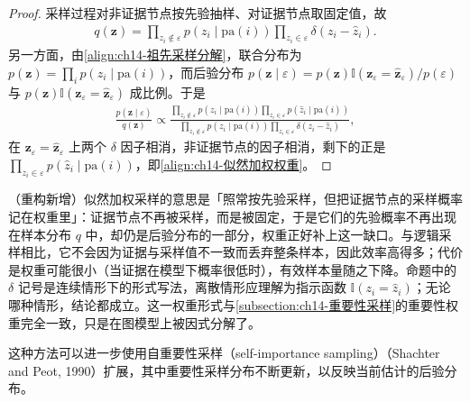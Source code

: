 \documentclass[../../main.tex]{subfiles}
\begin{document}
\begin{proof}
采样过程对非证据节点按先验抽样、对证据节点取固定值，故
\begin{align*}
q(\bm{z})=\prod_{z_{i}\notin\varepsilon}p\!\left(z_{i}\mid\mathrm{pa}(i)\right)\prod_{z_{i}\in\varepsilon}\delta\!\left(z_{i}-\hat{z}_{i}\right).
\end{align*}
另一方面，由\eqref{align:ch14-祖先采样分解}，联合分布为 $p(\bm{z})=\prod_{i}p\!\left(z_{i}\mid\mathrm{pa}(i)\right)$，而后验分布 $p\!\left(\bm{z}\mid\varepsilon\right)=p(\bm{z})\mathbb{I}\left(\bm{z}_{\varepsilon}=\hat{\bm{z}}_{\varepsilon}\right)/p(\varepsilon)$ 与 $p(\bm{z})\mathbb{I}\left(\bm{z}_{\varepsilon}=\hat{\bm{z}}_{\varepsilon}\right)$ 成比例。于是
\begin{align*}
\frac{p\!\left(\bm{z}\mid\varepsilon\right)}{q(\bm{z})}\propto\frac{\prod_{z_{i}\notin\varepsilon}p\!\left(z_{i}\mid\mathrm{pa}(i)\right)\prod_{z_{i}\in\varepsilon}p\!\left(\hat{z}_{i}\mid\mathrm{pa}(i)\right)}{\prod_{z_{i}\notin\varepsilon}p\!\left(z_{i}\mid\mathrm{pa}(i)\right)\prod_{z_{i}\in\varepsilon}\delta\!\left(z_{i}-\hat{z}_{i}\right)},
\end{align*}
在 $\bm{z}_{\varepsilon}=\hat{\bm{z}}_{\varepsilon}$ 上两个 $\delta$ 因子相消，非证据节点的因子相消，剩下的正是 $\prod_{z_{i}\in\varepsilon}p\!\left(\hat{z}_{i}\mid\mathrm{pa}(i)\right)$，即\eqref{align:ch14-似然加权权重}。
\end{proof}

\begin{remark}（重构新增）似然加权采样的意思是「照常按先验采样，但把证据节点的采样概率记在权重里」：证据节点不再被采样，而是被固定，于是它们的先验概率不再出现在样本分布 $q$ 中，却仍是后验分布的一部分，权重正好补上这一缺口。与逻辑采样相比，它不会因为证据与采样值不一致而丢弃整条样本，因此效率高得多；代价是权重可能很小（当证据在模型下概率很低时），有效样本量随之下降。命题中的 $\delta$ 记号是连续情形下的形式写法，离散情形应理解为指示函数 $\mathbb{I}\left(z_{i}=\hat{z}_{i}\right)$；无论哪种情形，结论都成立。这一权重形式与\cref{subsection:ch14-重要性采样}的重要性权重完全一致，只是在图模型上被因式分解了。
\end{remark}

这种方法可以进一步使用自重要性采样（self-importance sampling）（Shachter and Peot, 1990）扩展，其中重要性采样分布不断更新，以反映当前估计的后验分布。
\end{document}
